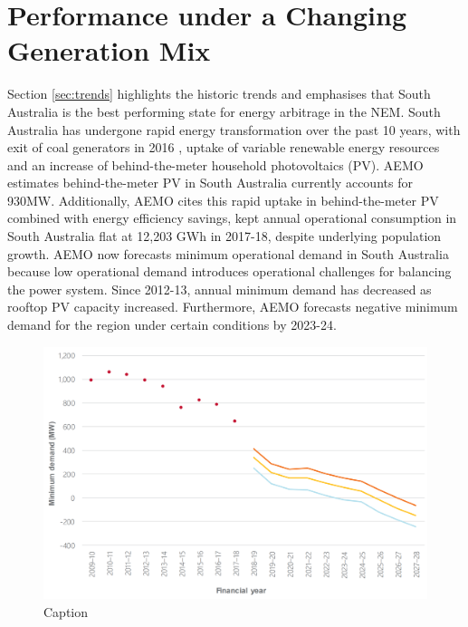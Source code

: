 \section{ Performance under a Changing Generation Mix}
\label{generation_mix}
Section \ref{sec:trends} highlights the historic trends and emphasises that South Australia is the best performing state for energy arbitrage in the NEM. South Australia has undergone rapid energy transformation over the past 10 years, with exit of coal generators in 2016 \parencite{sa_coal}, uptake of variable renewable energy resources and an increase of behind-the-meter household photovoltaics (PV). AEMO estimates behind-the-meter PV in South Australia currently accounts for 930MW. Additionally, AEMO cites this rapid uptake in behind-the-meter PV combined with energy efficiency savings, kept annual operational consumption in South Australia flat at 12,203 GWh in 2017-18, despite underlying population growth. 
\newline
\newline
AEMO now forecasts minimum operational demand in South Australia because low operational demand introduces operational challenges for balancing the power system. Since 2012-13, annual minimum demand has decreased as rooftop PV capacity increased. Furthermore, AEMO forecasts negative minimum demand for the region under certain conditions by 2023-24. 
\begin{figure}[H]
    \centering
    \includegraphics[width=\textwidth]{Pictures/Chapter3/minimum_demand.png}
    \caption{Caption}
    \label{fig:minimum_demand}
\end{figure}
